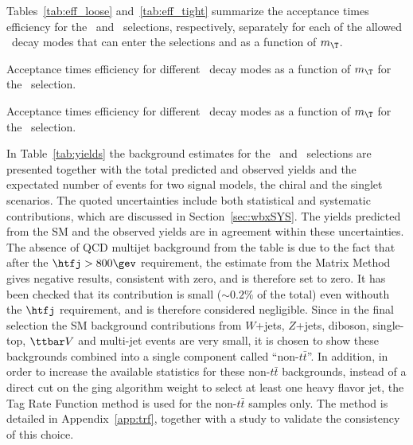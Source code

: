 Tables~\ref{tab:eff_loose} and~\ref{tab:eff_tight} 
summarize the acceptance times efficiency for the \loose\ and \tight\ selections, 
respectively,
separately for each of the allowed \TTbar\ decay modes that can enter
the selections and as a function of $m_{\T}$.

\begin{table}[!htb]
\begin{center}

\caption{Acceptance times efficiency for different \TTbar\ decay modes as a function of $m_{\T}$ for the \loose\ selection.}
\label{tab:eff_loose}

\caption{Acceptance times efficiency for different \TTbar\ decay modes as a function of $m_{\T}$ for the \tight\ selection.}
\label{tab:eff_tight}
\end{center}
\end{table}

\afterpage{\clearpage}

In Table~\ref{tab:yields} the background estimates 
for the \loose\ and \tight\ selections are presented
together with the total predicted and observed yields
and the expectated number of events for two signal models, the
chiral and the singlet scenarios. 
The quoted uncertainties include both statistical and systematic contributions,
which are discussed in Section~\ref{sec:wbxSYS}.
The yields predicted from the SM and the observed yields 
are in agreement within these uncertainties.
The absence of QCD multijet background from the table is due
to the fact that after the $\htfj>800\gev$ requirement, the estimate
from the Matrix Method gives negative results, consistent with zero,
and is therefore set to zero.
It has been checked that its contribution is small ($\sim 0.2\%$ of the total)
even withouth the $\htfj$ requirement, and is therefore considered negligible.
Since in the final selection the SM background contributions
from $W$+jets, $Z$+jets, diboson, single-top, $\ttbar V$ and multi-jet events
are very small, it is chosen to show these backgrounds combined into a
single component called ``non-$t\bar{t}$''.
In addition, in order to increase the available statistics for these
non-$t\bar{t}$ backgrounds, instead of a direct cut on the \btag ging algorithm
weight to select at least one heavy flavor jet, the Tag Rate Function method
is used for the non-$t\bar{t}$ samples only. The method is detailed in 
Appendix~\ref{app:trf}, together with a study to validate the consistency
of this choice.


